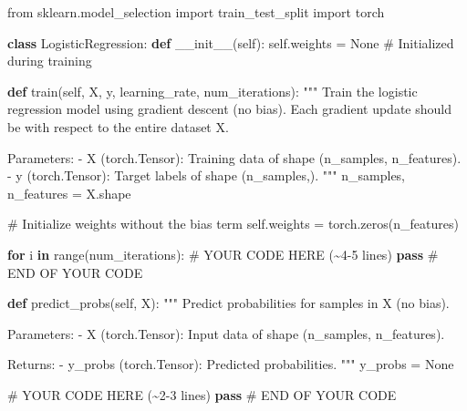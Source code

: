 \documentclass[
  letterpaper,
  numbers=noenddot,
  DIV=11,
  oneside]{scrreprt}
\newenvironment{Shaded}{\begin{snugshade}}{\end{snugshade}}
\newcommand{\BuiltInTok}[1]{\textcolor[rgb]{0.00,0.23,0.31}{#1}}
\newcommand{\CommentTok}[1]{\textcolor[rgb]{0.37,0.37,0.37}{#1}}
\newcommand{\ControlFlowTok}[1]{\textcolor[rgb]{0.00,0.23,0.31}{\textbf{#1}}}
\newcommand{\FunctionTok}[1]{\textcolor[rgb]{0.28,0.35,0.67}{#1}}
\newcommand{\ImportTok}[1]{\textcolor[rgb]{0.00,0.46,0.62}{#1}}
\newcommand{\KeywordTok}[1]{\textcolor[rgb]{0.00,0.23,0.31}{\textbf{#1}}}
\newcommand{\NormalTok}[1]{\textcolor[rgb]{0.00,0.23,0.31}{#1}}
\newcommand{\OperatorTok}[1]{\textcolor[rgb]{0.37,0.37,0.37}{#1}}
\newcommand{\RegionMarkerTok}[1]{\textcolor[rgb]{0.00,0.23,0.31}{#1}}
\newcommand{\VariableTok}[1]{\textcolor[rgb]{0.07,0.07,0.07}{#1}}
\theoremstyle{remark}
\begin{document}
\begin{Shaded}
\begin{Highlighting}[numbers=left,,]
\ImportTok{from}\NormalTok{ sklearn.model\_selection }\ImportTok{import}\NormalTok{ train\_test\_split}
\ImportTok{import}\NormalTok{ torch}

\KeywordTok{class}\NormalTok{ LogisticRegression:}
    \KeywordTok{def} \FunctionTok{\_\_init\_\_}\NormalTok{(}\VariableTok{self}\NormalTok{):}
        \VariableTok{self}\NormalTok{.weights }\OperatorTok{=} \VariableTok{None}  \CommentTok{\# Initialized during training}

    \KeywordTok{def}\NormalTok{ train(}\VariableTok{self}\NormalTok{, X, y, learning\_rate, num\_iterations):}
        \CommentTok{"""}
\CommentTok{        Train the logistic regression model using gradient descent (no bias).}
\CommentTok{        Each gradient update should be with respect to the entire dataset X.}

\CommentTok{        Parameters:}
\CommentTok{        {-} X (torch.Tensor): Training data of shape (n\_samples, n\_features).}
\CommentTok{        {-} y (torch.Tensor): Target labels of shape (n\_samples,).}
\CommentTok{        """}
\NormalTok{        n\_samples, n\_features }\OperatorTok{=}\NormalTok{ X.shape}

        \CommentTok{\# Initialize weights without the bias term}
        \VariableTok{self}\NormalTok{.weights }\OperatorTok{=}\NormalTok{ torch.zeros(n\_features)}

        \ControlFlowTok{for}\NormalTok{ i }\KeywordTok{in} \BuiltInTok{range}\NormalTok{(num\_iterations):}
            \CommentTok{\# YOUR CODE HERE (\textasciitilde{}4{-}5 lines)}
                \ControlFlowTok{pass}
            \CommentTok{\# }\RegionMarkerTok{END}\CommentTok{ OF YOUR CODE}

    \KeywordTok{def}\NormalTok{ predict\_probs(}\VariableTok{self}\NormalTok{, X):}
        \CommentTok{"""}
\CommentTok{        Predict probabilities for samples in X (no bias).}

\CommentTok{        Parameters:}
\CommentTok{        {-} X (torch.Tensor): Input data of shape (n\_samples, n\_features).}

\CommentTok{        Returns:}
\CommentTok{        {-} y\_probs (torch.Tensor): Predicted probabilities.}
\CommentTok{        """}
\NormalTok{        y\_probs }\OperatorTok{=} \VariableTok{None}

        \CommentTok{\# YOUR CODE HERE (\textasciitilde{}2{-}3 lines)}
        \ControlFlowTok{pass}
        \CommentTok{\# }\RegionMarkerTok{END}\CommentTok{ OF YOUR CODE}


\end{Highlighting}
\end{Shaded}
\end{document}
